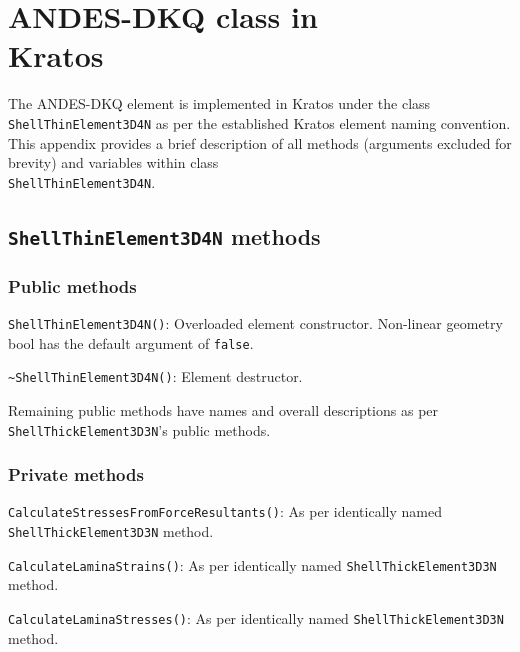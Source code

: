 
\chapter[ANDES-DKQ class in Kratos]{ANDES-DKQ class in \\ Kratos}
\label{app:ANDES element as programmed in Kratos}
\renewcommand{\Thema}{ANDES-DKQ class in Kratos}

The ANDES-DKQ element is implemented in Kratos under the class \texttt{ShellThinElement3D4N} as per the established Kratos element naming convention. This appendix provides a brief description of all methods (arguments excluded for brevity) and variables within class \\ \texttt{ShellThinElement3D4N}.

\section{\texttt{ShellThinElement3D4N} methods}
\subsection{Public methods}
\texttt{ShellThinElement3D4N()}: Overloaded element constructor. Non-linear geometry bool has the default argument of \texttt{false}.

\texttt{\textasciitilde ShellThinElement3D4N()}: Element destructor.

Remaining public methods have names and overall descriptions as per \texttt{ShellThickElement3D3N}'s public methods.

\subsection{Private methods}
\texttt{CalculateStressesFromForceResultants()}: As per identically named \texttt{ShellThickElement3D3N} method.

\texttt{CalculateLaminaStrains()}: As per identically named \texttt{ShellThickElement3D3N} method.

\texttt{CalculateLaminaStresses()}: As per identically named \texttt{ShellThickElement3D3N} method.

